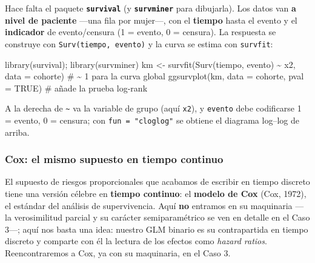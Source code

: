 \documentclass[
  letterpaper,
  DIV=11,
  numbers=noendperiod]{scrartcl}
\newenvironment{Shaded}{\begin{snugshade}}{\end{snugshade}}
\newcommand{\AttributeTok}[1]{\textcolor[rgb]{0.40,0.45,0.13}{#1}}
\newcommand{\CommentTok}[1]{\textcolor[rgb]{0.37,0.37,0.37}{#1}}
\newcommand{\ConstantTok}[1]{\textcolor[rgb]{0.56,0.35,0.01}{#1}}
\newcommand{\FunctionTok}[1]{\textcolor[rgb]{0.28,0.35,0.67}{#1}}
\newcommand{\NormalTok}[1]{\textcolor[rgb]{0.00,0.23,0.31}{#1}}
\newcommand{\OtherTok}[1]{\textcolor[rgb]{0.00,0.23,0.31}{#1}}
\newcommand{\SpecialCharTok}[1]{\textcolor[rgb]{0.37,0.37,0.37}{#1}}
\begin{document}
\begin{tcolorbox}[enhanced jigsaw, breakable, colframe=quarto-callout-tip-color-frame, left=2mm, arc=.35mm, colbacktitle=quarto-callout-tip-color!10!white, toprule=.15mm, colback=white, coltitle=black, rightrule=.15mm, opacitybacktitle=0.6, title=\textcolor{quarto-callout-tip-color}{\faLightbulb}\hspace{0.5em}{🔧 En R. Estimar y dibujar la curva de Kaplan--Meier}, titlerule=0mm, toptitle=1mm, bottomtitle=1mm, leftrule=.75mm, bottomrule=.15mm, opacityback=0]

Hace falta el paquete \textbf{\texttt{survival}} (y
\textbf{\texttt{survminer}} para dibujarla). Los datos van \textbf{a
nivel de paciente} ---una fila por mujer---, con el \textbf{tiempo}
hasta el evento y el \textbf{indicador} de evento/censura (1 = evento, 0
= censura). La respuesta se construye con \texttt{Surv(tiempo,\ evento)}
y la curva se estima con \texttt{survfit}:

\begin{Shaded}
\begin{Highlighting}[]
\FunctionTok{library}\NormalTok{(survival); }\FunctionTok{library}\NormalTok{(survminer)}
\NormalTok{km }\OtherTok{\textless{}{-}} \FunctionTok{survfit}\NormalTok{(}\FunctionTok{Surv}\NormalTok{(tiempo, evento) }\SpecialCharTok{\textasciitilde{}}\NormalTok{ x2, }\AttributeTok{data =}\NormalTok{ cohorte)  }\CommentTok{\# \textasciitilde{} 1 para la curva global}
\FunctionTok{ggsurvplot}\NormalTok{(km, }\AttributeTok{data =}\NormalTok{ cohorte, }\AttributeTok{pval =} \ConstantTok{TRUE}\NormalTok{)               }\CommentTok{\# añade la prueba log{-}rank}
\end{Highlighting}
\end{Shaded}

A la derecha de \texttt{\textasciitilde{}} va la variable de grupo (aquí
\texttt{x2}), y \texttt{evento} debe codificarse 1 = evento, 0 =
censura; con \texttt{fun\ =\ "cloglog"} se obtiene el diagrama log--log
de arriba.

\end{tcolorbox}

\hypertarget{sec-u15-cox}{%
\subsubsection{Cox: el mismo supuesto en tiempo
continuo}\label{sec-u15-cox}}

El supuesto de riesgos proporcionales que acabamos de escribir en tiempo
discreto tiene una versión célebre en \textbf{tiempo continuo}: el
\textbf{modelo de Cox} (Cox, 1972), el estándar del análisis de
supervivencia. Aquí \textbf{no} entramos en su maquinaria ---la
verosimilitud parcial y su carácter semiparamétrico se ven en detalle en
el Caso 3---; aquí nos basta una idea: nuestro GLM binario es su
contrapartida en tiempo discreto y comparte con él la lectura de los
efectos como \emph{hazard ratios}. Reencontraremos a Cox, ya con su
maquinaria, en el Caso 3.
\end{document}
